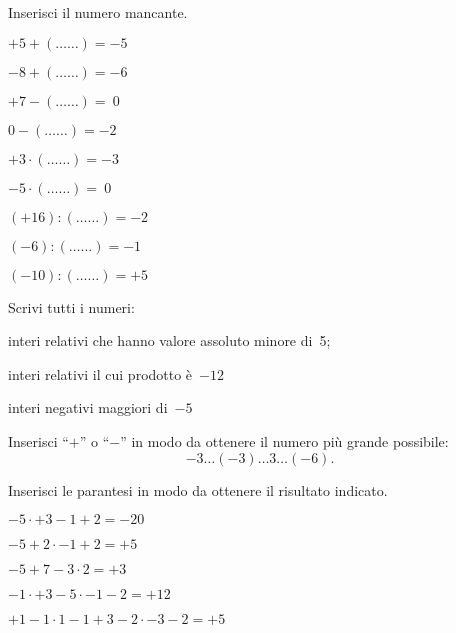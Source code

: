 \begin{esercizio}
Inserisci il numero mancante.
 \begin{multicols}{3}
 \begin{enumeratea}
 \item \(+5 + (\ldots\ldots) = -5\)
 \item \(-8 + (\ldots\ldots) = -6\)
 \item \(+7 - (\ldots\ldots) =~0\)
 \item \(0 - (\ldots\ldots) = -2\)
 \item \(+3\cdot (\ldots\ldots) = -3\)
 \item \(-5\cdot (\ldots\ldots) =~0\)
 \item \((+16): (\ldots\ldots) = -2\)
 \item \((-6): (\ldots\ldots) = -1\)
 \item \((-10): (\ldots\ldots) = +5\)
 \end{enumeratea}
 \end{multicols}
\end{esercizio}

\begin{esercizio}
 Scrivi tutti i numeri:
 \begin{enumeratea}
 \item interi relativi che hanno valore assoluto minore di~5;
 \item interi relativi il cui prodotto è~\(-12\)
 \item interi negativi maggiori di~\(-5\)
 \end{enumeratea}
\end{esercizio}

\begin{esercizio}
Inserisci ``\(+\)'' o ``\(-\)'' in modo da ottenere il numero più grande possibile:
 \[-3\ldots(-3)\ldots3\ldots(-6).\]
\end{esercizio}

\begin{esercizio}
Inserisci le parantesi in modo da ottenere il risultato indicato.
 \begin{enumeratea}
 \item \(-5 \cdot +3-1+2=-20\)
 \item \(-5+2\cdot-1+2=+5\)
 \item \(-5+7-3\cdot 2=+3\)
 \item \(-1\cdot +3-5\cdot -1-2=+12\)
 \item \(+1-1\cdot 1 -1+3-2\cdot -3-2=+5\)
 \end{enumeratea}
\end{esercizio}


